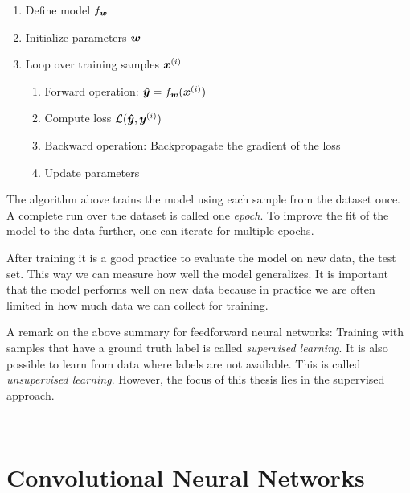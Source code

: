 		\begin{enumerate}
			\item Define model $f_{\bm{w}}$
			\item Initialize parameters $\bm{w}$
			\item Loop over training samples $\bm{x}^{(i)}$ %
			\begin{enumerate}
				\item Forward operation: $\bm{\hat{y}} = f_{\bm{w}}(\bm{x}^{(i)})$
				\item Compute loss $\mathcal{L}(\bm{\hat{y}}, \bm{y}^{(i)})$
				\item Backward operation: Backpropagate the gradient of the loss 
				\item Update parameters
			\end{enumerate}
		\end{enumerate}
		The algorithm above trains the model using each sample from the dataset once.
		A complete run over the dataset is called one \emph{epoch}.
		To improve the fit of the model to the data further, one can iterate for multiple epochs.
		
		After training it is a good practice to evaluate the model on new data, the test set.
		This way we can measure how well the model generalizes.
		It is important that the model performs well on new data because in practice we are often limited in how much data we can collect for training.
		
		A remark on the above summary for feedforward neural networks:
		Training with samples that have a ground truth label is called \emph{supervised learning}.
		It is also possible to learn from data where labels are not available.
		This is called \emph{unsupervised learning}.
		However, the focus of this thesis lies in the supervised approach.
		

		\\
		
	\section{Convolutional Neural Networks}
	
